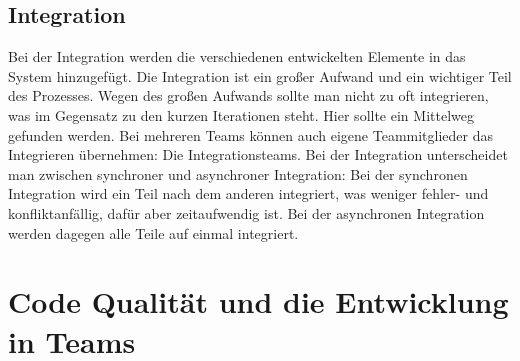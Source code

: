\subsection{Integration}
Bei der Integration werden die verschiedenen entwickelten Elemente in das System hinzugefügt. Die Integration ist ein großer Aufwand und ein wichtiger Teil des Prozesses. Wegen des großen Aufwands sollte man nicht zu oft integrieren, was im Gegensatz zu den kurzen Iterationen steht. Hier sollte ein Mittelweg gefunden werden. Bei mehreren Teams können auch eigene Teammitglieder das Integrieren übernehmen: Die Integrationsteams. Bei der Integration unterscheidet man zwischen synchroner und asynchroner Integration: Bei der synchronen Integration wird ein Teil nach dem anderen integriert, was weniger fehler- und konfliktanfällig, dafür aber zeitaufwendig ist. Bei der asynchronen Integration werden dagegen alle Teile auf einmal integriert. ~\parencite[vgl. 106-110]{ecksteinTeams}
\section{Code Qualität und die Entwicklung in Teams}
